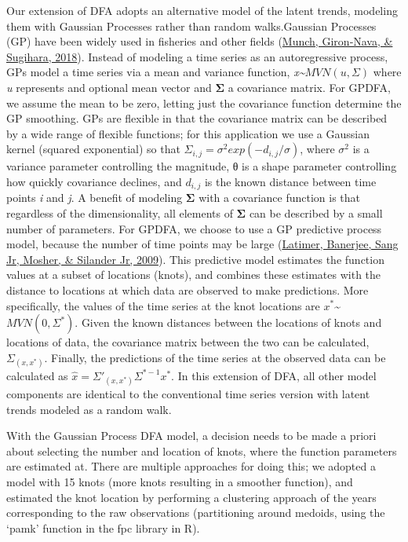 \documentclass [11pt, proquest] {uwthesis}[2015/03/03]
\begin{document}
Our extension of DFA adopts an alternative model of the latent trends, modeling them with Gaussian Processes rather than random walks.Gaussian Processes (GP) have been widely used in fisheries and other fields (\protect\hyperlink{ref-Munch2018}{Munch, Giron‐Nava, \& Sugihara, 2018}). Instead of modeling a time series as an autoregressive process, GPs model a time series via a mean and variance function, \emph{x\textasciitilde{}}\(MVN(u,\Sigma)\) where \emph{u} represents and optional mean vector and \textbf{Σ} a covariance matrix. For GPDFA, we assume the mean to be zero, letting just the covariance function determine the GP smoothing. GPs are flexible in that the covariance matrix can be described by a wide range of flexible functions; for this application we use a Gaussian kernel (squared exponential) so that \(\Sigma_{i,j}=\sigma^2 exp(-d_{i,j}/\sigma)\), where \(\sigma^2\) is a variance parameter controlling the magnitude, θ is a shape parameter controlling how quickly covariance declines, and \(d_{i,j}\) is the known distance between time points \emph{i} and \emph{j}. A benefit of modeling \textbf{Σ} with a covariance function is that regardless of the dimensionality, all elements of \textbf{Σ} can be described by a small number of parameters. For GPDFA, we choose to use a GP predictive process model, because the number of time points may be large (\protect\hyperlink{ref-Latimer2009}{Latimer, Banerjee, Sang Jr, Mosher, \& Silander Jr, 2009}). This predictive model estimates the function values at a subset of locations (knots), and combines these estimates with the distance to locations at which data are observed to make predictions. More specifically, the values of the time series at the knot locations are \(x^*\)\textasciitilde{}\(MVN(0,\Sigma^*)\). Given the known distances between the locations of knots and locations of data, the covariance matrix between the two can be calculated, \(\Sigma_{(x,x^*)}\). Finally, the predictions of the time series at the observed data can be calculated as \(\hat{x}=\Sigma'_{(x,x^*)}\Sigma^{*-1}x^*\). In this extension of DFA, all other model components are identical to the conventional time series version with latent trends modeled as a random walk.

With the Gaussian Process DFA model, a decision needs to be made a priori about selecting the number and location of knots, where the function parameters are estimated at. There are multiple approaches for doing this; we adopted a model with 15 knots (more knots resulting in a smoother function), and estimated the knot location by performing a clustering approach of the years corresponding to the raw observations (partitioning around medoids, using the `pamk' function in the fpc library in R).
\end{document}
